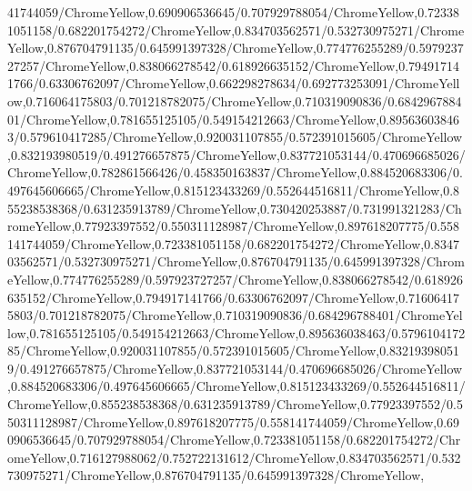 {\begin{tikzternal}
{41744059/ChromeYellow,0.690906536645/0.707929788054/ChromeYellow,0.723381051158/0.682201754272/ChromeYellow,0.834703562571/0.532730975271/ChromeYellow,0.876704791135/0.645991397328/ChromeYellow,0.774776255289/0.597923727257/ChromeYellow,0.838066278542/0.618926635152/ChromeYellow,0.794917141766/0.63306762097/ChromeYellow,0.662298278634/0.692773253091/ChromeYellow,0.716064175803/0.701218782075/ChromeYellow,0.710319090836/0.684296788401/ChromeYellow,0.781655125105/0.549154212663/ChromeYellow,0.895636038463/0.579610417285/ChromeYellow,0.920031107855/0.572391015605/ChromeYellow,0.832193980519/0.491276657875/ChromeYellow,0.837721053144/0.470696685026/ChromeYellow,0.782861566426/0.458350163837/ChromeYellow,0.884520683306/0.497645606665/ChromeYellow,0.815123433269/0.552644516811/ChromeYellow,0.855238538368/0.631235913789/ChromeYellow,0.730420253887/0.731991321283/ChromeYellow,0.77923397552/0.550311128987/ChromeYellow,0.897618207775/0.558141744059/ChromeYellow,0.723381051158/0.682201754272/ChromeYellow,0.834703562571/0.532730975271/ChromeYellow,0.876704791135/0.645991397328/ChromeYellow,0.774776255289/0.597923727257/ChromeYellow,0.838066278542/0.618926635152/ChromeYellow,0.794917141766/0.63306762097/ChromeYellow,0.716064175803/0.701218782075/ChromeYellow,0.710319090836/0.684296788401/ChromeYellow,0.781655125105/0.549154212663/ChromeYellow,0.895636038463/0.579610417285/ChromeYellow,0.920031107855/0.572391015605/ChromeYellow,0.832193980519/0.491276657875/ChromeYellow,0.837721053144/0.470696685026/ChromeYellow,0.884520683306/0.497645606665/ChromeYellow,0.815123433269/0.552644516811/ChromeYellow,0.855238538368/0.631235913789/ChromeYellow,0.77923397552/0.550311128987/ChromeYellow,0.897618207775/0.558141744059/ChromeYellow,0.690906536645/0.707929788054/ChromeYellow,0.723381051158/0.682201754272/ChromeYellow,0.716127988062/0.752722131612/ChromeYellow,0.834703562571/0.532730975271/ChromeYellow,0.876704791135/0.645991397328/ChromeYellow,
}
\end{tikzternal}}
